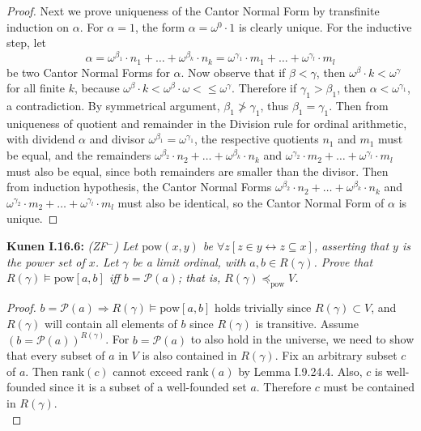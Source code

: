\documentclass{article}
\begin{document}
\begin{proof}
    Next we prove uniqueness of the Cantor Normal Form by transfinite
    induction on $\alpha$. For $\alpha=1$, the form $\alpha=\omega^0\cdot1$
    is clearly unique. For the inductive step, let
    \[\alpha =\omega^{\beta_1}\cdot n_1 +\ldots +\omega^{\beta_k}\cdot
    n_k =\omega^{\gamma_1}\cdot m_1 +\ldots +\omega^{\gamma_l}\cdot
    m_l\]
    be two Cantor Normal Forms for $\alpha$. Now observe that if
    $\beta<\gamma$, then $\omega^\beta\cdot k<\omega^\gamma$ for all finite
    $k$, because $\omega^\beta\cdot k<\omega^\beta\cdot\omega
    <\leq\omega^\gamma$. Therefore if $\gamma_1>\beta_1$, then
    $\alpha<\omega^{\gamma_1}$, a contradiction. By symmetrical argument,
    $\beta_1\not>\gamma_1$, thus $\beta_1=\gamma_1$. Then from uniqueness
    of quotient and remainder in the Division rule for ordinal arithmetic,
    with dividend $\alpha$ and divisor $\omega^{\beta_1}=\omega^{\gamma_1}$,
    the respective quotients $n_1$ and $m_1$ must be equal, and the
    remainders $\omega^{\beta_2}\cdot n_2 +\ldots +\omega^{\beta_k}\cdot
    n_k$ and $\omega^{\gamma_2}\cdot m_2 +\ldots +\omega^{\gamma_l}\cdot
    m_l$ must also be equal, since both remainders are smaller than the
    divisor. Then from induction hypothesis, the Cantor Normal Forms
    $\omega^{\beta_2}\cdot n_2 +\ldots +\omega^{\beta_k}\cdot
    n_k$ and $\omega^{\gamma_2}\cdot m_2 +\ldots +\omega^{\gamma_l}\cdot
    m_l$ must also be identical, so the Cantor Normal Form of $\alpha$ is
    unique.
  \end{proof}

\textbf{Kunen I.16.6:} \it (ZF$^-$) Let $\text{pow}(x,y)$ be $\forall z
  [z\in y \leftrightarrow z\subseteq x]$, asserting that $y$ is the power
  set of $x$. Let $\gamma$ be a limit ordinal, with $a,b\in R(\gamma)$.
  Prove that $R(\gamma) \models\text{pow}[a,b]$ iff $b=\mathcal{P}(a)$;
  that is, $R(\gamma) \preceq_{\text{pow}} V$.

  \begin{proof}
    $b=\mathcal{P}(a) \Rightarrow R(\gamma) \models\text{pow}[a,b]$ holds
    trivially since $R(\gamma)\subset V$, and $R(\gamma)$ will contain all
    elements of $b$ since $R(\gamma)$ is transitive. Assume
    $(b=\mathcal{P}(a))^{R(\gamma)}$. For $b=\mathcal{P}(a)$ to also hold
    in the universe, we need to show that every subset of $a$ in $V$ is
    also contained in $R(\gamma)$. Fix an arbitrary subset $c$ of $a$. Then
    $\text{rank}(c)$ cannot exceed $\text{rank}(a)$ by Lemma I.9.24.4.
    Also, $c$ is well-founded since it is a subset of a well-founded set
    $a$. Therefore $c$ must be contained in $R(\gamma)$. \\
  \end{proof}
\end{document}
